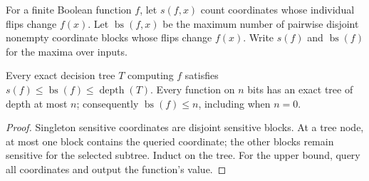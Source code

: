 \begin{definition}
  \label{def:analysis-sensitivity}
  \leanok
  For a finite Boolean function $f$, let $s(f,x)$ count coordinates whose
  individual flips change $f(x)$. Let $\operatorname{bs}(f,x)$ be the maximum
  number of pairwise disjoint nonempty coordinate blocks whose flips change
  $f(x)$. Write $s(f)$ and $\operatorname{bs}(f)$ for the maxima over inputs.
\end{definition}

\begin{theorem}
  \label{thm:analysis-block-sensitivity-query}
  \leanok
  Every exact decision tree $T$ computing $f$ satisfies
  $s(f)\le\operatorname{bs}(f)\le\operatorname{depth}(T)$.
  Every function on $n$ bits has an exact tree of depth at most $n$;
  consequently $\operatorname{bs}(f)\le n$, including when $n=0$.
\end{theorem}
\begin{proof}
  \leanok
  Singleton sensitive coordinates are disjoint sensitive blocks. At a tree
  node, at most one block contains the queried coordinate; the other blocks
  remain sensitive for the selected subtree. Induct on the tree. For the
  upper bound, query all coordinates and output the function's value.
\end{proof}

